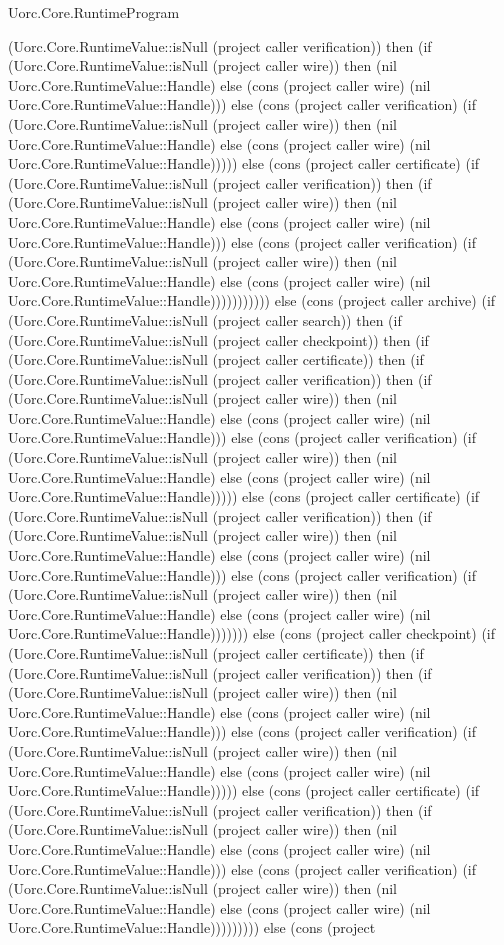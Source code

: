 \begin{lexlean}{Uorc.Core.RuntimeProgram}
\begin{semanticmodule}
{(Uorc.Core.RuntimeValue::isNull (project caller verification)) then (if (Uorc.Core.RuntimeValue::isNull (project caller wire)) then (nil Uorc.Core.RuntimeValue::Handle) else (cons (project caller wire) (nil Uorc.Core.RuntimeValue::Handle))) else (cons (project caller verification) (if (Uorc.Core.RuntimeValue::isNull (project caller wire)) then (nil Uorc.Core.RuntimeValue::Handle) else (cons (project caller wire) (nil Uorc.Core.RuntimeValue::Handle))))) else (cons (project caller certificate) (if (Uorc.Core.RuntimeValue::isNull (project caller verification)) then (if (Uorc.Core.RuntimeValue::isNull (project caller wire)) then (nil Uorc.Core.RuntimeValue::Handle) else (cons (project caller wire) (nil Uorc.Core.RuntimeValue::Handle))) else (cons (project caller verification) (if (Uorc.Core.RuntimeValue::isNull (project caller wire)) then (nil Uorc.Core.RuntimeValue::Handle) else (cons (project caller wire) (nil Uorc.Core.RuntimeValue::Handle))))))))))) else (cons (project caller archive) (if (Uorc.Core.RuntimeValue::isNull (project caller search)) then (if (Uorc.Core.RuntimeValue::isNull (project caller checkpoint)) then (if (Uorc.Core.RuntimeValue::isNull (project caller certificate)) then (if (Uorc.Core.RuntimeValue::isNull (project caller verification)) then (if (Uorc.Core.RuntimeValue::isNull (project caller wire)) then (nil Uorc.Core.RuntimeValue::Handle) else (cons (project caller wire) (nil Uorc.Core.RuntimeValue::Handle))) else (cons (project caller verification) (if (Uorc.Core.RuntimeValue::isNull (project caller wire)) then (nil Uorc.Core.RuntimeValue::Handle) else (cons (project caller wire) (nil Uorc.Core.RuntimeValue::Handle))))) else (cons (project caller certificate) (if (Uorc.Core.RuntimeValue::isNull (project caller verification)) then (if (Uorc.Core.RuntimeValue::isNull (project caller wire)) then (nil Uorc.Core.RuntimeValue::Handle) else (cons (project caller wire) (nil Uorc.Core.RuntimeValue::Handle))) else (cons (project caller verification) (if (Uorc.Core.RuntimeValue::isNull (project caller wire)) then (nil Uorc.Core.RuntimeValue::Handle) else (cons (project caller wire) (nil Uorc.Core.RuntimeValue::Handle))))))) else (cons (project caller checkpoint) (if (Uorc.Core.RuntimeValue::isNull (project caller certificate)) then (if (Uorc.Core.RuntimeValue::isNull (project caller verification)) then (if (Uorc.Core.RuntimeValue::isNull (project caller wire)) then (nil Uorc.Core.RuntimeValue::Handle) else (cons (project caller wire) (nil Uorc.Core.RuntimeValue::Handle))) else (cons (project caller verification) (if (Uorc.Core.RuntimeValue::isNull (project caller wire)) then (nil Uorc.Core.RuntimeValue::Handle) else (cons (project caller wire) (nil Uorc.Core.RuntimeValue::Handle))))) else (cons (project caller certificate) (if (Uorc.Core.RuntimeValue::isNull (project caller verification)) then (if (Uorc.Core.RuntimeValue::isNull (project caller wire)) then (nil Uorc.Core.RuntimeValue::Handle) else (cons (project caller wire) (nil Uorc.Core.RuntimeValue::Handle))) else (cons (project caller verification) (if (Uorc.Core.RuntimeValue::isNull (project caller wire)) then (nil Uorc.Core.RuntimeValue::Handle) else (cons (project caller wire) (nil Uorc.Core.RuntimeValue::Handle))))))))) else (cons (project }
\end{semanticmodule}
\end{lexlean}
